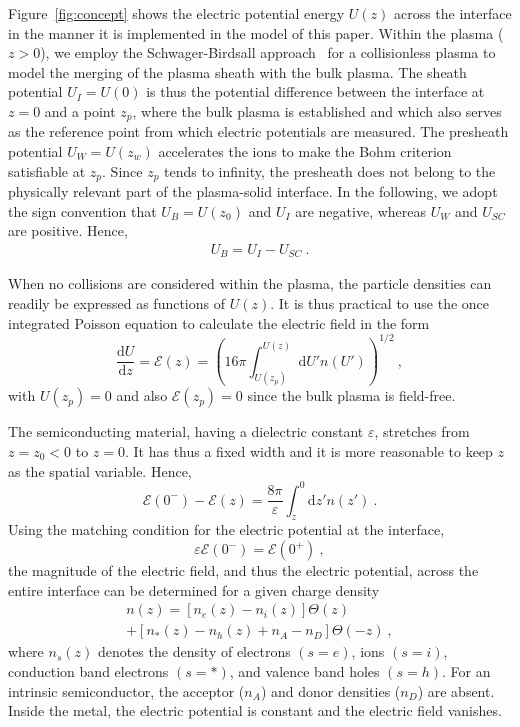 \documentclass[pre,reprint,floats]{revtex4-1}
\newcommand{\rmd}{\ensuremath{\mathrm{d}}}
\begin{document}
Figure~\ref{fig:concept} shows the electric potential energy $U(z)$ across the interface in the manner 
it is implemented in the model of this paper. Within the plasma ($z>0$), we employ the Schwager-Birdsall 
approach~\cite{SB90} for a collisionless plasma to model the merging of the plasma sheath with the bulk 
plasma. The sheath potential $U_I=U(0)$ is thus the potential difference between the interface at 
$z=0$ and a point $z_p$, where the bulk plasma is established and which also serves as the reference
point from which electric potentials are measured. The presheath potential $U_W=U(z_w)$ accelerates 
the ions to make the Bohm criterion satisfiable at $z_p$. Since $z_p$ tends to infinity, the presheath 
does not belong to the physically relevant part of the plasma-solid interface. In the following, we adopt 
the sign convention that $U_B=U(z_0)$ and $U_I$ are negative, whereas $U_W$ and $U_{SC}$ are positive. 
Hence, 
\begin{align}
U_B=U_I-U_{SC}~. 
\label{VoltageDrop}
\end{align}
	
When no collisions are considered within the plasma, the particle densities can readily be expressed as 
functions of $U(z)$. It is thus practical to use the once integrated Poisson equation to calculate the 
electric field in the form
\begin{equation}
	\label{eq:U'P}
	\frac{\rmd U}{\rmd z} = \mathcal{E}(z) =
	\left(16 \pi\int_{U(z_p)}^{U(z)}\rmd U' n(U')\right)^{1/2} ~,
\end{equation}
with $U(z_p) = 0$ and also $\mathcal{E}(z_p) = 0$ since the bulk plasma is field-free.
	
The semiconducting material, having a dielectric constant $\varepsilon$, stretches from $z=z_0<0$ to $z=0$. 
It has thus a fixed width and it is more reasonable to keep $z$ as the spatial variable. Hence,  
\begin{equation}
\label{eq:U'SC}
\mathcal{E}(0^-)-\mathcal{E}(z) = 
\frac{8\pi}{\varepsilon}\int_{z}^{0}\rmd z' n(z') ~.
\end{equation}
Using the matching condition for the electric potential at the interface,
\begin{equation}
	\label{eq:matching}
	\varepsilon \mathcal{E} (0^-) = \mathcal{E}(0^+)~,
\end{equation}
the magnitude of the electric field, and thus the electric potential, across the entire interface can be 
determined for a given charge density
%
\begin{multline}
\label{eq:ntot}
n(z) = \left[n_e(z) -  n_i(z)\right]\Theta(z)\\
+ \left[n_*(z) - n_h(z) + n_A -n_D \right] \Theta(-z)~,
\end{multline}
where $n_s(z)$ denotes the density of electrons $(s=e)$, ions $(s=i)$, conduction band electrons $(s=*)$, 
and valence band holes $(s=h)$. For an intrinsic semiconductor, the acceptor ($n_A$) and donor densities ($n_D$)
are absent. Inside the metal, the electric potential is constant and the electric field vanishes.
\end{document}
